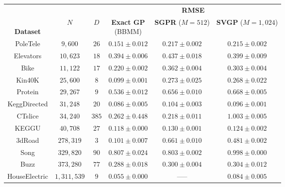 \begin{tabular}{ cccccc }
  \toprule
  &&&
	\multicolumn{3}{c}{{\bf RMSE}}  \\
  \cmidrule{4-6}
  \thead{\\{\bf Dataset}} & \thead{\\$N$} & \thead{\\$D$} &
  \thead{{\bf Exact GP} \\ (BBMM)} & \thead{{\bf SGPR} \\ ($M\!=\!512$)} & \thead{{\bf SVGP} \\ ($M\!=\!1,\!024$)}
  \\
  \midrule
	PoleTele             & $9,\!600$          & $26$  &   $\mathbf{0.151}\pm 0.012$  & $0.217\pm 0.002$          & $0.215\pm 0.002$  \\
	Elevators            & $10,\!623$         & $18$  &   $\mathbf{0.394}\pm 0.006$  & $0.437\pm 0.018$          & $0.399\pm 0.009$  \\
	Bike                 & $11,\!122$         & $17$  &   $\mathbf{0.220}\pm 0.002$  & $0.362\pm 0.004$          & $0.303\pm 0.004$  \\
	Kin40K               & $25,\!600$         & $8$   &   $\mathbf{0.099}\pm 0.001$  & $0.273\pm 0.025$          & $0.268\pm 0.022$  \\
	Protein              & $29,\!267$         & $9$   &   $\mathbf{0.536}\pm 0.012$  & $0.656\pm 0.010$          & $0.668\pm 0.005$  \\
	KeggDirected         & $31,\!248$         & $20$  &   $\mathbf{0.086}\pm 0.005$  & $0.104\pm 0.003$          & $0.096\pm 0.001$  \\
	CTslice              & $34,\!240$         & $385$ &   $0.262\pm 0.448$           & $\mathbf{0.218}\pm 0.011$ & $1.003\pm 0.005$  \\
	KEGGU                & $40,\!708$         & $27$  &   $\mathbf{0.118}\pm 0.000$  & $0.130\pm 0.001$          & $0.124\pm 0.002$  \\
	3dRoad               & $278,\!319$        & $3$   &   $\mathbf{0.101}\pm 0.007$  & $0.661\pm 0.010$          & $0.481\pm 0.002$  \\
	Song                 & $329,\!820$        & $90$  &   $0.807\pm 0.024$           & $\mathbf{0.803}\pm 0.002$ & $0.998\pm 0.000$  \\
  Buzz                 & $373,\!280$        & $77$  &   $\mathbf{0.288}\pm 0.018$  & $0.300\pm 0.004$          & $0.304\pm 0.012$  \\
	HouseElectric        & $1,\!311,\!539$    & $9$   &   $\mathbf{0.055}\pm 0.000$  & -----                     & $0.084\pm 0.005$  \\
  \bottomrule
\end{tabular}

